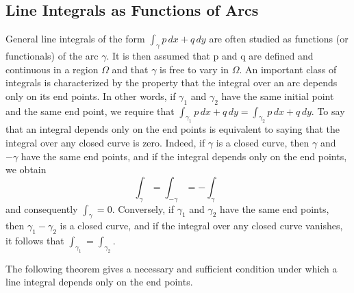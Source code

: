 \setcounter{section}{1}\setcounter{subsection}{2}\subsection{Line Integrals as Functions of Arcs}\label{sec:4.1.3}
General line integrals of the form $\int_{\gamma} p \, dx + q \, dy$ are often studied as functions (or functionals) of the arc $\gamma$. It is then assumed that p and q are defined and continuous in a region $\Omega$ and that $\gamma$ is free to vary in $\Omega$. An important class of integrals is characterized by the property that the integral over an arc depends only on its end points. In other words, if $\gamma_{1}$ and $\gamma_{2}$ have the same initial point and the same end point, we require that $\int_{\gamma_{1}} p \, dx + q \, dy = \int_{\gamma_{2}} p \, dx + q \, dy$. To say that an integral depends only on the end points is equivalent to saying that the integral over any closed curve is zero. Indeed, if $\gamma$ is a closed curve, then $\gamma$ and $-\gamma$ have the same end points, and if the integral depends only on the end points, we obtain
\begin{equation*}
\int_ {\gamma} = \int_ {- \gamma} = - \int_ {\gamma}
\end{equation*}
and consequently $\int_{\gamma} = 0$. Conversely, if $\gamma_1$ and $\gamma_2$ have the same end points, then $\gamma_1 - \gamma_2$ is a closed curve, and if the integral over any closed curve vanishes, it follows that $\int_{\gamma_1} = \int_{\gamma_2}$.


The following theorem gives a necessary and sufficient condition under which a line integral depends only on the end points.

